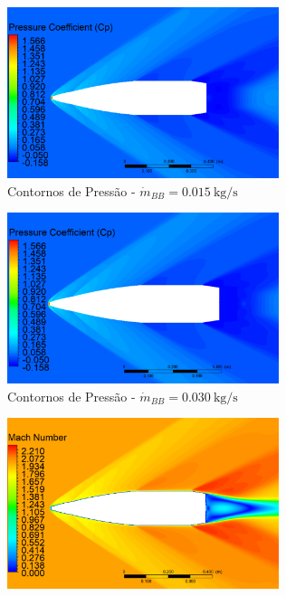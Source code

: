 \begin{figure}[!ht]
	\centering
	\begin{subfigure}[b]{0.47\textwidth}
        \centering
        \includegraphics[height=5cm,width=\textwidth]{contorno-pressao-2306K-vazao-0015-1pol.png}
        \caption{Contornos de Pressão - $\Dot{m}_{BB} = \qty{0,015}{\kilogram\per\second}$}
        \label{fig:contorno-pressao-bb-1pol-vazao0015}
    \end{subfigure}
    \hfill
    \begin{subfigure}[b]{0.47\textwidth}
        \centering
        \includegraphics[height=5cm,width=\textwidth]{contorno-pressao-2306K-vazao-0030-1pol.png}
        \caption{Contornos de Pressão - $\Dot{m}_{BB} = \qty{0,030}{\kilogram\per\second}$}
        \label{fig:contorno-pressao-bb-1pol-vazao0030}
    \end{subfigure}
    \hfill
    \begin{subfigure}[b]{0.47\textwidth}
        \centering
        \includegraphics[height=5cm,width=\textwidth]{contorno-velocidade-2306K-vazao-0015-1pol.png}

\end{subfigure}
\end{figure}
